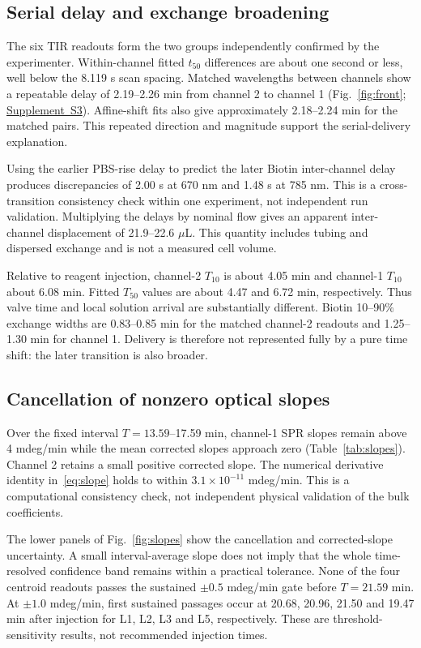 \documentclass[lettersize,journal]{IEEEtran}
\newcommand{\supp}[1]{\href{SPR_smart_stop_supplement.pdf}{Supplement~#1}}
\begin{document}
\subsection{Serial delay and exchange broadening}
The six TIR readouts form the two groups independently confirmed by the
experimenter. Within-channel fitted $t_{50}$ differences are about one
second or less, well below the 8.119 s scan spacing. Matched wavelengths
between channels show a repeatable delay of 2.19--2.26 min from channel 2
to channel 1 (Fig.~\ref{fig:front}; \supp{S3}). Affine-shift fits
also give approximately 2.18--2.24 min for the matched pairs. This repeated
direction and magnitude support the serial-delivery explanation.


Using the earlier PBS-rise delay to predict the later Biotin inter-channel
delay produces discrepancies of 2.00 s at 670 nm and 1.48 s at 785 nm.
This is a cross-transition consistency check within one experiment, not
independent run validation. Multiplying the delays by nominal flow gives
an apparent inter-channel displacement of 21.9--22.6 $\mu$L. This quantity
includes tubing and dispersed exchange and is not a measured cell volume.

Relative to reagent injection, channel-2 $T_{10}$ is about
4.05 min and channel-1 $T_{10}$ about 6.08 min. Fitted $T_{50}$ values
are about 4.47 and 6.72 min, respectively. Thus valve time and local
solution arrival are substantially different. Biotin 10--90\% exchange
widths are 0.83--0.85 min for the matched channel-2 readouts and
1.25--1.30 min for channel 1. Delivery is therefore not represented fully
by a pure time shift: the later transition is also broader.

\subsection{Cancellation of nonzero optical slopes}
Over the fixed interval $T=13.59$--17.59 min, channel-1 SPR slopes remain above
4 mdeg/min while the mean corrected slopes approach zero
(Table~\ref{tab:slopes}). Channel 2 retains a small positive corrected slope.
The numerical derivative identity in~\eqref{eq:slope} holds to within
$3.1\times10^{-11}$ mdeg/min. This is a computational consistency check,
not independent physical validation of the bulk coefficients.

The lower panels of Fig.~\ref{fig:slopes} show the cancellation and corrected-slope
uncertainty. A small interval-average slope does not imply that the whole
time-resolved confidence band remains within a practical tolerance. None
of the four centroid readouts passes the sustained $\pm0.5$ mdeg/min gate
before $T=21.59$ min. At $\pm1.0$ mdeg/min, first sustained passages occur at
20.68, 20.96, 21.50 and 19.47 min after injection for L1, L2, L3 and L5, respectively.
These are threshold-sensitivity results, not recommended injection times.
\end{document}
